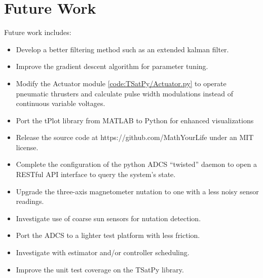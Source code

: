 \section{Future Work}
\label{chap:FutureWork}


Future work includes:

\begin{itemize}
\item Develop a better filtering method such as an extended kalman filter.
\item Improve the gradient descent algorithm for parameter tuning.
\item Modify the Actuator module \ref{code:TSatPy/Actuator.py} to operate pneumatic thrusters and calculate pulse width modulations instead of continuous variable voltages.
\item Port the tPlot library from MATLAB to Python for enhanced visualizations
\item Release the source code at https://github.com/MathYourLife under an MIT license.
\item Complete the configuration of the python ADCS ``twisted'' daemon to open a RESTful API interface to query the system's state.
\item Upgrade the three-axis magnetometer nutation to one with a less noisy sensor readings.
\item Investigate use of coarse sun sensors for nutation detection.
\item Port the ADCS to a lighter test platform with less friction.
\item Investigate with estimator and/or controller scheduling.
\item Improve the unit test coverage on the TSatPy library.
\end{itemize}

